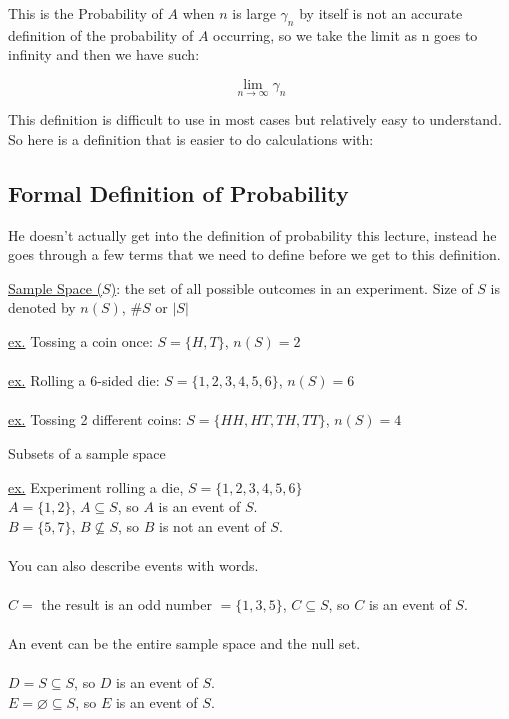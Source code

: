 \documentclass[12pt, twoside]{article}
\begin{document}
This is the Probability of $A$ when $n$ is large $\gamma_n$ by itself is not an accurate definition of the probability of $A$ occurring, so we take the limit as n goes to infinity and then we have such:

$$\lim_{n\to\infty} \gamma_n$$

This definition is difficult to use in most cases but relatively easy to understand. So here is a definition that is easier to do calculations with:

\subsection{Formal Definition of Probability}

He doesn't actually get into the definition of probability this lecture, instead he goes through a few terms that we need to define before we get to this definition.



	\begin{tcolorbox}[title=Sample Space ($S$)]
	\underline{Sample Space ($S$)}: the set of all possible outcomes in an experiment. Size of $S$ is denoted by $n(S)$, $\#S$ or $|S|$
	\end{tcolorbox}
	\underline{ex.} Tossing a coin once: $S = \{ H,T \}$, $n(S) = 2$\\
	\\
	\underline{ex.} Rolling a 6-sided die: $S = \{ 1,2,3,4,5,6 \}$, $n(S) = 6$\\
	\\
	\underline{ex.} Tossing 2 different coins: $S = \{ HH, HT, TH, TT \}$, $n(S) = 4$


	\begin{tcolorbox}[title=Events] Subsets of a sample space
	\end{tcolorbox}
	\underline{ex.} Experiment rolling a die, $S = \{ 1,2,3,4,5,6 \}$\\
	$A = \{ 1,2 \}$, $A \subseteq S$, so $A$ is an event of $S$.\\
	$B = \{ 5,7 \}$, $B \nsubseteq S$, so $B$ is not an event of $S$.\\
	\\
	You can also describe events with words.\\
	\\
	$C =$ the result is an odd number $= \{ 1,3,5 \}$, $C \subseteq S$, so $C$ is an event of $S$.\\
	\\
	An event can be the entire sample space and the null set.\\
	\\
	$D = S \subseteq S$, so $D$ is an event of $S$.\\
	$E = \varnothing \subseteq S$, so $E$ is an event of $S$.\\
\end{document}
